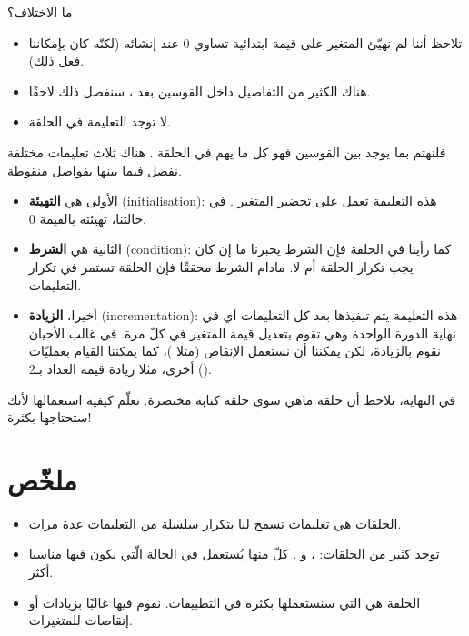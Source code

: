 ما الاختلاف؟

\begin{itemize}
	\item تلاحظ أننا لم نهيّئ المتغير 
	على قيمة ابتدائية تساوي 0 عند إنشائه (لكنّه كان بإمكاننا فعل ذلك).
	\item هناك الكثير من التفاصيل داخل القوسين بعد 
	،
	سنفصل ذلك لاحقًا.
	\item لا توجد التعليمة 
	في الحلقة.
\end{itemize}

فلنهتم بما يوجد بين القوسين فهو كل ما يهم في الحلقة
.
هناك ثلاث تعليمات مختلفة نفصل فيما بينها بفواصل منقوطة.

\begin{itemize}
	\item الأولى هي
	\textbf{التهيئة}
	(\textenglish{initialisation}):
	هذه التعليمة تعمل على تحضير المتغير
	.
	في حالتنا، تهيئته بالقيمة 0.
	\item الثانية هي
	\textbf{الشرط}
	(\textenglish{condition}):
	كما رأينا في الحلقة 
	فإن الشرط يخبرنا ما إن كان يجب تكرار الحلقة أم لا. مادام الشرط محققًا فإن الحلقة تستمر في تكرار التعليمات.
	\item أخيرا،
	\textbf{الزيادة}
	(\textenglish{incrementation}):
	هذه التعليمة يتم تنفيذها بعد كل التعليمات أي في نهاية الدورة الواحدة وهي تقوم بتعديل قيمة المتغير 
	في كلّ مرة. في غالب الأحيان نقوم بالزيادة، لكن يمكننا أن نستعمل الإنقاص (مثلا 
	)،
	كما يمكننا القيام بعمليّات أخرى، مثلا زيادة قيمة العداد بـ2
	().
\end{itemize}

في النهاية، نلاحظ أن حلقة
ماهي سوى حلقة كتابة مختصرة. تعلّم كيفية استعمالها لأنك ستحتاجها بكثرة!

\section*{ملخّص}

\begin{itemize}
	\item الحلقات هي تعليمات تسمح لنا بتكرار سلسلة من التعليمات عدة مرات.
	\item توجد كثير من الحلقات:
	،
 و
	.
	كلّ منها  يُستعمل في الحالة الّتي يكون فيها مناسبا أكثر.
	\item الحلقة
	هي التي سنستعملها بكثرة في التطبيقات. نقوم فيها غالبًا بزيادات أو إنقاصات للمتغيرات.
\end{itemize}
